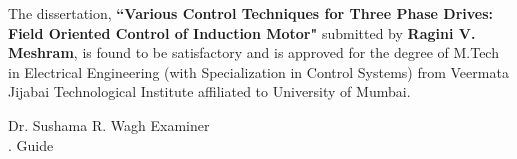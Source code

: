 \begin{spacing}{1.5}
\begin{approval}

The dissertation, \textbf{``Various Control Techniques for Three Phase Drives: Field Oriented Control of Induction Motor"} submitted by \textbf{Ragini V. Meshram}, is found to be satisfactory and is approved for the degree of M.Tech in Electrical Engineering (with Specialization in Control Systems) from Veermata Jijabai Technological Institute affiliated to University of Mumbai. 


\vspace{4cm}


Dr. Sushama R. Wagh \hspace{7cm} Examiner \\
.\hspace{0.6cm} Guide




\newpage

\end{approval}
\end{spacing}